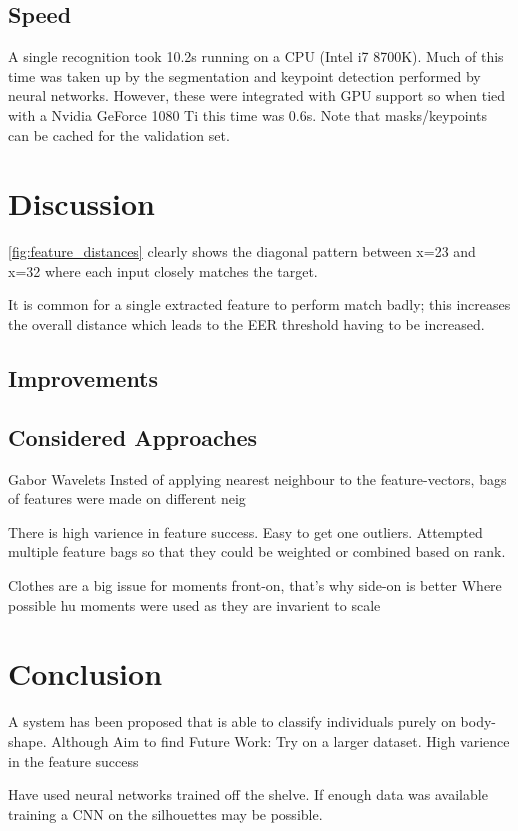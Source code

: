 \documentclass[conference]{IEEEtran}
\begin{document}
\subsection{Speed}
\noindent A single recognition took 10.2s running on a CPU (Intel i7 8700K). Much of this time was taken up by the segmentation and keypoint detection performed by neural networks. However, these were integrated with GPU support so when tied with a Nvidia GeForce 1080 Ti this time was 0.6s.
Note that masks/keypoints can be cached for the validation set.

\section{Discussion}

\ref{fig:feature_distances} clearly shows the diagonal pattern between x=23 and x=32 where each input closely matches the target.


It is common for a single extracted feature to perform match badly; this increases the overall distance which leads to the EER threshold having to be increased.

\subsection{Improvements}


\subsection{Considered Approaches}
Gabor Wavelets
Insted of applying nearest neighbour to the feature-vectors, bags of features were made on different neig

There is high varience in feature success. Easy to get one outliers. Attempted multiple feature bags so that they could be weighted or combined based on rank.

Clothes are a big issue for moments front-on, that's why side-on is better
Where possible hu moments were used as they are invarient to scale

\section{Conclusion}
A system has been proposed that is able to classify individuals purely on body-shape. 
Although 
Aim to find 
Future Work: Try on a larger dataset. High varience in the feature success 

Have used neural networks trained off the shelve. If enough data was available training a CNN on the silhouettes may be possible.



\end{document}
